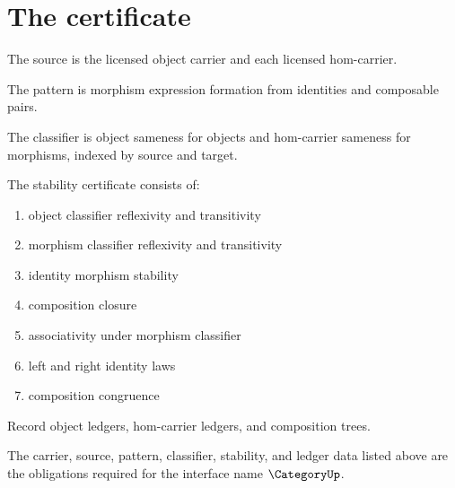 \section{The certificate}

\begin{definition}
\label{def:category-source-specification}
The source is the licensed object carrier and each licensed hom-carrier.
\end{definition}

\begin{definition}
\label{def:category-pattern-specification}
The pattern is morphism expression formation from identities and composable pairs.
\end{definition}

\begin{definition}
\label{def:category-classifier-specification}
The classifier is object sameness for objects and hom-carrier sameness for morphisms, indexed by source and target.
\end{definition}

\begin{definition}
\label{def:category-stability-certificate}
The stability certificate consists of:
\begin{enumerate}
  \item object classifier reflexivity and transitivity
  \item morphism classifier reflexivity and transitivity
  \item identity morphism stability
  \item composition closure
  \item associativity under morphism classifier
  \item left and right identity laws
  \item composition congruence
\end{enumerate}
\end{definition}

\begin{definition}
\label{def:category-ledger-policy}
Record object ledgers, hom-carrier ledgers, and composition trees.
\end{definition}

\begin{definition}
\label{def:category-certificate-obligations}
The carrier, source, pattern, classifier, stability, and ledger data listed above are the obligations required for the interface name \(\CategoryUp\).
\end{definition}

